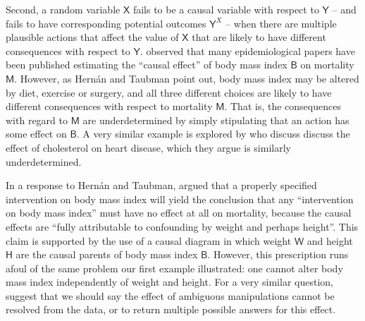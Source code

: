 \documentclass{article}
\theoremstyle{plain}
\theoremstyle{definition}
\newcommand{\RV}[1]{\ensuremath{\mathsf{#1}}}
\begin{document}
Second, a random variable $\RV{X}$ fails to be a causal variable with respect to $\RV{Y}$ -- and fails to have corresponding potential outcomes $\RV{Y}^X$ -- when there are multiple plausible actions that affect the value of $\RV{X}$ that are likely to have different consequences with respect to $\RV{Y}$. \citet{hernan_does_2008} observed that many epidemiological papers have been published estimating the ``causal effect'' of body mass index $\RV{B}$ on mortality $\RV{M}$. However, as Hernán and Taubman point out, body mass index may be altered by diet, exercise or surgery, and all three different choices are likely to have different consequences with respect to mortality $\RV{M}$. That is, the consequences with regard to $\RV{M}$ are underdetermined by simply stipulating that an action has some effect on $\RV{B}$. A very similar example is explored by  \citet{spirtes_causal_2004,eberhardt_contemporary_2022} who discuss discuss the effect of cholesterol on heart disease, which they argue is similarly underdetermined.


In a response to Hernán and Taubman, \citet{shahar_association_2009} argued that a properly specified intervention on body mass index will yield the conclusion that any ``intervention on body mass index'' must have no effect at all on mortality, because the causal effects are ``fully attributable to confounding by weight and perhaps height''. This claim is supported by the use of a causal diagram in which weight $\RV{W}$ and height $\RV{H}$ are the causal parents of body mass index $\RV{B}$. However, this prescription runs afoul of the same problem our first example illustrated: one cannot alter body mass index independently of weight and height. For a very similar question, \citet{spirtes_causal_2004} suggest that we should say the effect of ambiguous manipulations cannot be resolved from the data, or to return multiple possible answers for this effect.
\end{document}
